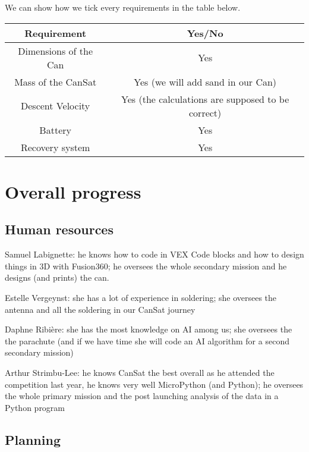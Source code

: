 \documentclass[]{article}
\begin{document}
We can show how we tick every requirements in the table below. 

\begin{center}
    \begin{tabular}{|c|c|} %
        \hline %
        \textbf{Requirement} & \textbf{Yes/No} \\ \hline
        Dimensions of the Can & Yes \\ \hline
        Mass of the CanSat & Yes (we will add sand in our Can) \\ \hline
        Descent Velocity & Yes (the calculations are supposed to be correct) \\ \hline
        Battery & Yes \\ \hline
        Recovery system & Yes \\ \hline
    \end{tabular}
\end{center}



\newpage
\section{Overall progress}

\subsection{Human resources}

Samuel Labignette: he knows how to code in VEX Code blocks and how to design things in 3D with Fusion360; he oversees the whole secondary mission and he designs (and prints) the can. 

Estelle Vergeynst: she has a lot of experience in soldering; she oversees the antenna and all the soldering in our CanSat journey

Daphne Ribière: she has the most knowledge on AI among us; she oversees the the parachute (and if we have time she will code an AI algorithm for a second secondary mission)

Arthur Strimbu-Lee: he knows CanSat the best overall as he attended the competition last year, he knows very well MicroPython (and Python); he oversees the whole primary mission and the post launching analysis of the data in a Python program


\subsection{Planning}
\end{document}
